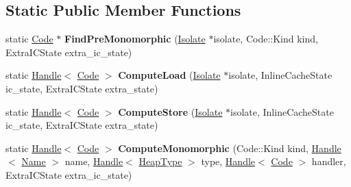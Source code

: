 \subsection*{Static Public Member Functions}
\begin{DoxyCompactItemize}
\item 
\hypertarget{classv8_1_1internal_1_1_property_i_c_compiler_acb4fdf8cd5130903b94f8a283344e362}{}static \hyperlink{classv8_1_1internal_1_1_code}{Code} $\ast$ {\bfseries Find\+Pre\+Monomorphic} (\hyperlink{classv8_1_1internal_1_1_isolate}{Isolate} $\ast$isolate, Code\+::\+Kind kind, Extra\+I\+C\+State extra\+\_\+ic\+\_\+state)\label{classv8_1_1internal_1_1_property_i_c_compiler_acb4fdf8cd5130903b94f8a283344e362}

\item 
\hypertarget{classv8_1_1internal_1_1_property_i_c_compiler_a9afeb49f0b3162f815a51e1ed7902407}{}static \hyperlink{classv8_1_1internal_1_1_handle}{Handle}$<$ \hyperlink{classv8_1_1internal_1_1_code}{Code} $>$ {\bfseries Compute\+Load} (\hyperlink{classv8_1_1internal_1_1_isolate}{Isolate} $\ast$isolate, Inline\+Cache\+State ic\+\_\+state, Extra\+I\+C\+State extra\+\_\+state)\label{classv8_1_1internal_1_1_property_i_c_compiler_a9afeb49f0b3162f815a51e1ed7902407}

\item 
\hypertarget{classv8_1_1internal_1_1_property_i_c_compiler_abde673712c00ab3771f4f99cf132de40}{}static \hyperlink{classv8_1_1internal_1_1_handle}{Handle}$<$ \hyperlink{classv8_1_1internal_1_1_code}{Code} $>$ {\bfseries Compute\+Store} (\hyperlink{classv8_1_1internal_1_1_isolate}{Isolate} $\ast$isolate, Inline\+Cache\+State ic\+\_\+state, Extra\+I\+C\+State extra\+\_\+state)\label{classv8_1_1internal_1_1_property_i_c_compiler_abde673712c00ab3771f4f99cf132de40}

\item 
\hypertarget{classv8_1_1internal_1_1_property_i_c_compiler_a37b2122343eeef55759e7fbbd8e029a7}{}static \hyperlink{classv8_1_1internal_1_1_handle}{Handle}$<$ \hyperlink{classv8_1_1internal_1_1_code}{Code} $>$ {\bfseries Compute\+Monomorphic} (Code\+::\+Kind kind, \hyperlink{classv8_1_1internal_1_1_handle}{Handle}$<$ \hyperlink{classv8_1_1internal_1_1_name}{Name} $>$ name, \hyperlink{classv8_1_1internal_1_1_handle}{Handle}$<$ \hyperlink{classv8_1_1internal_1_1_type_impl}{Heap\+Type} $>$ type, \hyperlink{classv8_1_1internal_1_1_handle}{Handle}$<$ \hyperlink{classv8_1_1internal_1_1_code}{Code} $>$ handler, Extra\+I\+C\+State extra\+\_\+ic\+\_\+state)\label{classv8_1_1internal_1_1_property_i_c_compiler_a37b2122343eeef55759e7fbbd8e029a7}


\end{DoxyCompactItemize}
